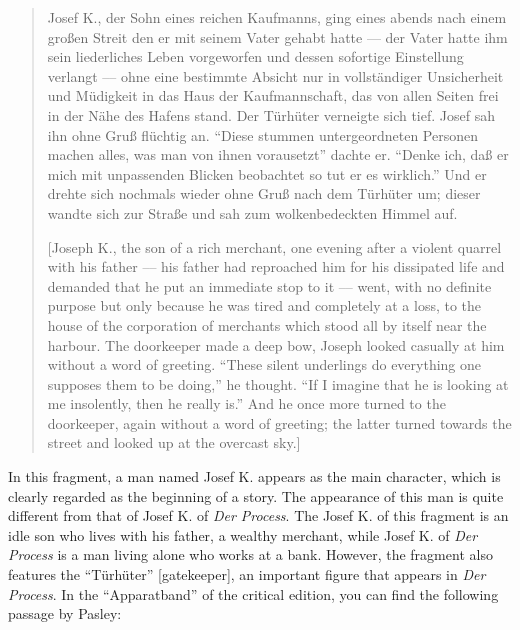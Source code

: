\documentclass{article}
\begin{document}
\begin{quote}
Josef K., der Sohn eines reichen Kaufmanns, ging eines abends nach einem
großen Streit den er mit seinem Vater gehabt hatte –– der Vater hatte
ihm sein liederliches Leben vorgeworfen und dessen sofortige Einstellung
verlangt –– ohne eine bestimmte Absicht nur in vollständiger
Unsicherheit und Müdigkeit in das Haus der Kaufmannschaft, das von allen
Seiten frei in der Nähe des Hafens stand. Der Türhüter verneigte sich
tief. Josef sah ihn ohne Gruß flüchtig an. ``Diese stummen
untergeordneten Personen machen alles, was man von ihnen vorausetzt''
dachte er. ``Denke ich, daß er mich mit unpassenden Blicken beobachtet so
tut er es wirklich.'' Und er drehte sich nochmals wieder ohne Gruß nach
dem Türhüter um; dieser wandte sich zur Straße und sah zum
wolkenbedeckten Himmel auf. 

\begin{flushright}
    \parencite[666--667]{kafka_tagebucher_1990}
\end{flushright}

{[}Joseph K., the son of a rich merchant, one evening after a violent
quarrel with his father –– his father had reproached him for his
dissipated life and demanded that he put an immediate stop to it ––
went, with no definite purpose but only because he was tired and
completely at a loss, to the house of the corporation of merchants which
stood all by itself near the harbour. The doorkeeper made a deep bow,
Joseph looked casually at him without a word of greeting. ``These silent
underlings do everything one supposes them to be doing,'' he thought. ``If
I imagine that he is looking at me insolently, then he really is.'' And
he once more turned to the doorkeeper, again without a word of greeting;
the latter turned towards the street and looked up at the overcast
sky.{]} 

\begin{flushright}
    \parencite[257]{kafka_diaries_1975}
\end{flushright}

\end{quote}

In this fragment, a man named Josef K. appears as the main character,
which is clearly regarded as the beginning of a story. The appearance of
this man is quite different from that of Josef K. of \emph{Der Process}.
The Josef K. of this fragment is an idle son who lives with his father, a wealthy merchant, while Josef K. of \emph{Der Process} is a man
living alone who works at a bank. However, the fragment also features
the ``Türhüter'' {[}gatekeeper{]}, an important figure that appears
in \emph{Der Process}. In the ``Apparatband'' of the critical edition,
you can find the following passage by Pasley:
\end{document}
